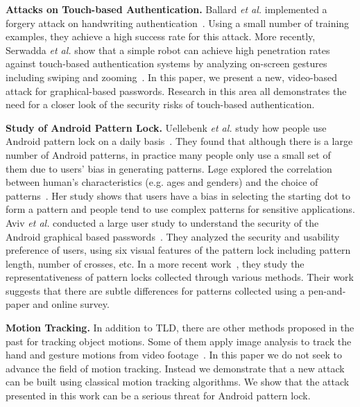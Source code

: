 \vspace{2mm}
\noindent \textbf{Attacks on Touch-based Authentication.}
Ballard \emph{et al.} implemented a forgery attack on handwriting
authentication~\cite{ballard2007forgery}. Using a small number of training
examples, they achieve a high success rate for this attack. More recently,
Serwadda \emph{et al.} show that a simple robot can achieve high penetration
rates against touch-based authentication systems by analyzing on-screen gestures including
swiping and zooming~\cite{serwadda2013kids}.
In this paper, we present a new, video-based attack for graphical-based passwords.
Research in this area all demonstrates the need for a closer look of the security risks of touch-based authentication.


\vspace{2mm}
\noindent \textbf{Study of Android Pattern Lock.}
Uellebenk \emph{et al.} study how people use Android pattern lock on
a daily basis~\cite{uellenbeck2013quantifying}.  They found that although there
is a large number of Android patterns, in
practice many people only use a small set of them due to users' bias in
generating patterns. L{\o}ge explored the correlation between
human's characteristics (e.g. ages and genders) and the choice of
patterns~\cite{alpnorway}. Her study shows that users have a bias in selecting the
starting dot to form a pattern and people tend to use complex patterns
for sensitive applications.
Aviv \emph{et al.} conducted a large user study to understand the security of the Android graphical based passwords~\cite{Aviv2014Understanding}. They analyzed the security and usability preference of users, using six visual features of the pattern lock including pattern length, number of crosses, etc.
In a more recent work~\cite{Aviv2016Anlyzing}, they study the representativeness of
pattern locks collected through various methods. Their work suggests
that there are subtle differences for patterns collected using a pen-and-paper
 and online survey.

\vspace{2mm}
\noindent \textbf{Motion Tracking.} In addition to TLD, there are other methods proposed in the past for tracking object
motions. Some of them apply image analysis to track the hand and gesture
motions from video
footage~\cite{Yang:2002:EMT:605089.605095,Stenger:2006:MHT:1159166.1159342,
Beh2014Rule}. In this paper we do not seek to advance the field of
motion tracking. Instead we demonstrate that a new attack can be built
using classical motion tracking algorithms. We show that the attack presented in
this work can be a serious threat for Android pattern lock. %
